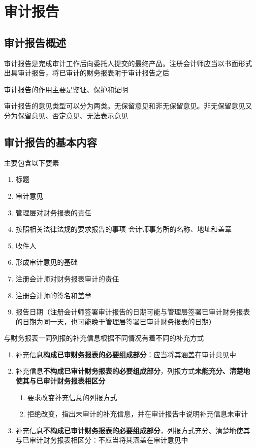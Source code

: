 \documentclass[UTF8,12pt]{ctexart}
\numberwithin{equation}{section} %
\numberwithin{figure}{section}
\numberwithin{table}{section}
\begin{document}
	\newpage
	\section{审计报告}
	\subsection{审计报告概述}
	审计报告是完成审计工作后向委托人提交的最终产品。注册会计师应当以书面形式出具审计报告，将已审计的财务报表附于审计报告之后
	
	审计报告的作用主要是鉴证、保护和证明
	
	审计报告的意见类型可以分为两类。无保留意见和非无保留意见。非无保留意见又分为保留意见、否定意见、无法表示意见
	
	\subsection{审计报告的基本内容}
	主要包含以下要素
	\begin{enumerate}
		\item 标题                   
		
		\item 审计意见               
		
		\item 管理层对财务报表的责任 

		\item 按照相关法律法规的要求报告的事项  会计师事务所的名称、地址和盖章   
		
		\item 收件人
		
		\item 形成审计意见的基础
		
		\item 注册会计师对财务报表审计的责任
		
		\item 注册会计师的签名和盖章
		
		\item 报告日期（注册会计师签署审计报告的日期可能与管理层签署已审计财务报表的日期为同一天，也可能晚于管理层签署已审计财务报表的日期）
	\end{enumerate}
	
	与财务报表一同列报的补充信息根据不同情况有着不同的补充方式
	\begin{enumerate}
		\item 补充信息\textbf{构成已审财务报表的必要组成部分}：应当将其涵盖在审计意见中
		
		\item 补充信息\textbf{不构成已审计财务报表的必要组成部分}，列报方式\textbf{未能充分、清楚地使其与已审计财务报表相区分}
		\begin{enumerate}
			\item 要求改变补充信息的列报方式
			
			\item 拒绝改变，指出未审计的补充信息，并在审计报告中说明补充信息未审计
		\end{enumerate}
		
		\item 补充信息\textbf{不构成已审计财务报表的必要组成部分}，列报方式充分、清楚地使其与已审计财务报表相区分：不应当将其涵盖在审计意见中
	\end{enumerate}
	
\end{document}
